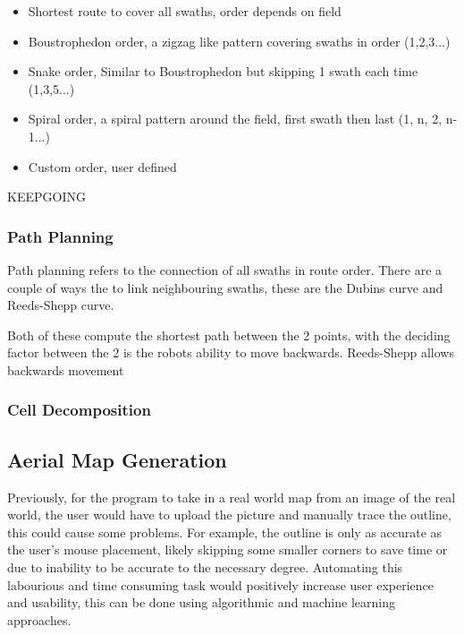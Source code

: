 \documentclass[final]{cmpreport_02}
\begin{document}
\begin{itemize}
	\item{Shortest route to cover all swaths, order depends on field}
	\item{Boustrophedon order, a zigzag like pattern covering swaths in order (1,2,3...)}
	\item{Snake order, Similar to Boustrophedon but skipping 1 swath each time (1,3,5...)}
	\item{Spiral order, a spiral pattern around the field, first swath then last (1, n, 2, n-1...)}
	\item{Custom order, user defined}
\end{itemize}


KEEPGOING

\subsubsection{Path Planning}
Path planning refers to the connection of all swaths in route order.
There are a couple of ways the to link neighbouring swaths, these are the Dubins curve and Reeds-Shepp curve.


Both of these compute the shortest path between the 2 points, with the deciding factor between the 2 is the robots ability to move backwards.
Reeds-Shepp allows backwards movement


\subsubsection{Cell Decomposition}






\subsection{Aerial Map Generation}
Previously, for the program to take in a real world map from an image of the real world, the user would have to upload the picture and manually trace the outline, this could cause some problems.
For example, the outline is only as accurate as the user's mouse placement, likely skipping some smaller corners to save time or due to inability to be accurate to the necessary degree.
Automating this labourious and time consuming task would positively increase user experience and usability, this can be done using algorithmic and machine learning approaches.
\end{document}
